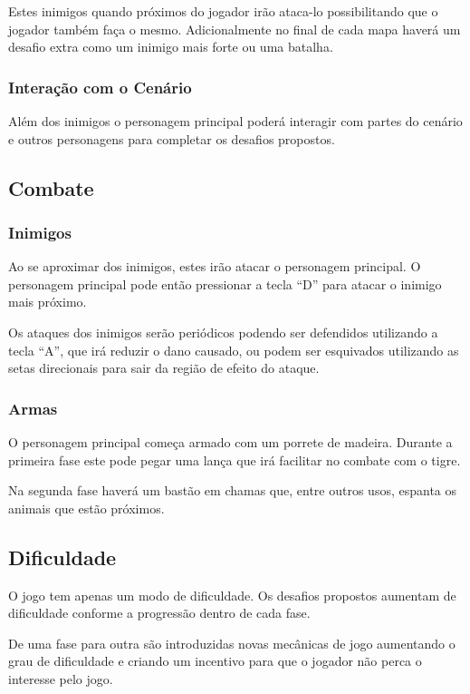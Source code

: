 Estes inimigos quando próximos do jogador irão ataca-lo possibilitando que o 
jogador também faça o mesmo. 
Adicionalmente no final de cada mapa haverá um desafio extra como um inimigo
 mais forte ou uma batalha.  

\subsubsection {Interação com o Cenário}

Além dos inimigos o personagem principal poderá interagir com partes do
 cenário e outros personagens para completar os
desafios propostos.

\subsection {Combate}
\subsubsection{Inimigos}
Ao se aproximar dos inimigos, estes irão atacar o personagem principal. O
 personagem principal pode então pressionar a tecla ``D'' para atacar o
 inimigo mais 
próximo.

Os ataques dos inimigos serão periódicos podendo ser defendidos utilizando a
 tecla ``A'', que irá reduzir o dano causado, ou podem ser esquivados
 utilizando as 
setas direcionais para sair da região de efeito do ataque.

\subsubsection {Armas}
O personagem principal começa armado com um porrete de madeira. Durante a
 primeira fase este pode pegar uma lança que irá facilitar no combate com o
 tigre. 

Na segunda fase haverá um bastão em chamas que, entre outros usos, espanta
 os animais que estão próximos.

\subsection {Dificuldade}

O jogo tem apenas um modo de dificuldade. Os desafios propostos aumentam de
 dificuldade conforme a progressão dentro de cada fase.

De uma fase para outra são introduzidas novas mecânicas de jogo aumentando o
 grau de dificuldade e criando um incentivo para que o jogador 
não perca o interesse pelo jogo.

